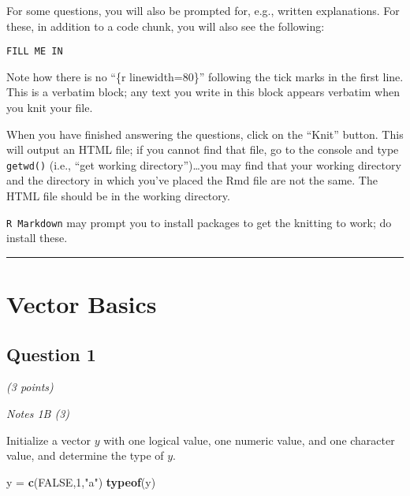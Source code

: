 \documentclass[
]{article}
\newenvironment{Shaded}{\begin{snugshade}}{\end{snugshade}}
\newcommand{\DecValTok}[1]{\textcolor[rgb]{0.00,0.00,0.81}{#1}}
\newcommand{\KeywordTok}[1]{\textcolor[rgb]{0.13,0.29,0.53}{\textbf{#1}}}
\newcommand{\NormalTok}[1]{#1}
\newcommand{\OtherTok}[1]{\textcolor[rgb]{0.56,0.35,0.01}{#1}}
\newcommand{\StringTok}[1]{\textcolor[rgb]{0.31,0.60,0.02}{#1}}
\begin{document}
For some questions, you will also be prompted for, e.g., written
explanations. For these, in addition to a code chunk, you will also see
the following:

\begin{verbatim}
FILL ME IN
\end{verbatim}

Note how there is no ``\{r linewidth=80\}'' following the tick marks in
the first line. This is a verbatim block; any text you write in this
block appears verbatim when you knit your file.

When you have finished answering the questions, click on the ``Knit''
button. This will output an HTML file; if you cannot find that file, go
to the console and type \texttt{getwd()} (i.e., ``get working
directory'')\ldots you may find that your working directory and the
directory in which you've placed the Rmd file are not the same. The HTML
file should be in the working directory.

\texttt{R\ Markdown} may prompt you to install packages to get the
knitting to work; do install these.

\begin{center}\rule{0.5\linewidth}{0.5pt}\end{center}

\hypertarget{vector-basics}{%
\section{Vector Basics}\label{vector-basics}}

\hypertarget{question-1}{%
\subsection{Question 1}\label{question-1}}

\emph{(3 points)}

\emph{Notes 1B (3)}

Initialize a vector \(y\) with one logical value, one numeric value, and
one character value, and determine the type of \(y\).

\begin{Shaded}
\begin{Highlighting}[]
\NormalTok{y =}\StringTok{ }\KeywordTok{c}\NormalTok{(}\OtherTok{FALSE}\NormalTok{,}\DecValTok{1}\NormalTok{,}\StringTok{"a"}\NormalTok{)}
\KeywordTok{typeof}\NormalTok{(y)}
\end{Highlighting}
\end{Shaded}
\end{document}
